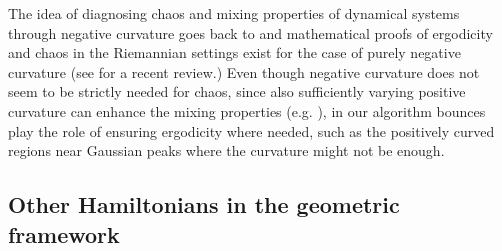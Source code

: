 \documentclass[twoside,11pt]{article}
\begin{document}
The idea of diagnosing chaos and mixing properties of dynamical systems through negative curvature goes back to \cite{krylov} and mathematical proofs of ergodicity and chaos in the Riemannian settings exist for the case of purely negative curvature (see \cite{valva2019manifolds} for a recent review.) 
Even though negative curvature does not seem to be strictly needed for chaos, since also sufficiently varying positive curvature can enhance the mixing properties (e.g. \cite{pettini2007geometry, seiler2014positive}), in our algorithm bounces play the role of ensuring ergodicity where needed, such as the positively curved regions near Gaussian peaks where the curvature might not be enough.  

\subsection{Other Hamiltonians in the geometric framework}
\end{document}

